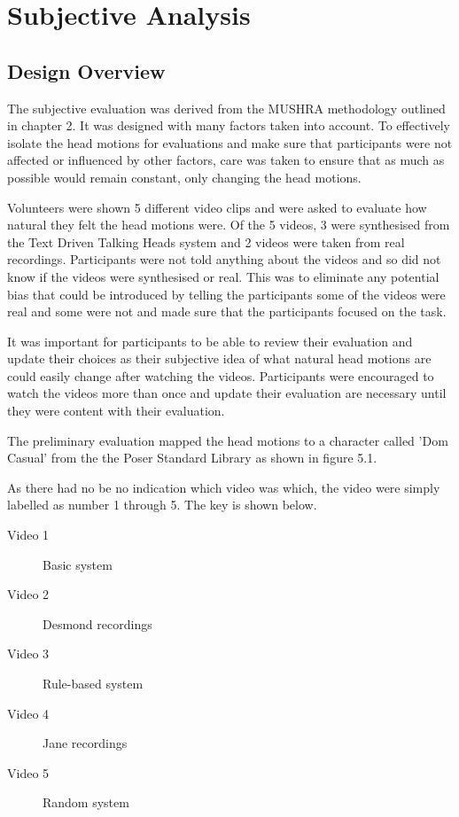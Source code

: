 \documentclass[bsc,frontabs,twoside,singlespacing,parskip,deptreport]{infthesis}
\begin{document}
\section{Subjective Analysis}

\subsection{Design Overview}

The subjective evaluation was derived from the MUSHRA methodology outlined in chapter 2. It was designed with many factors taken into account. To effectively isolate the head motions for evaluations and make sure that participants were not affected or influenced by other factors, care was taken to ensure that as much as possible would remain constant, only changing the head motions.

Volunteers were shown 5 different video clips and were asked to evaluate how natural they felt the head motions were. Of the 5 videos, 3 were synthesised from the Text Driven Talking Heads system and 2 videos were taken from real recordings. Participants were not told anything about the videos and so did not know if the videos were synthesised or real. This was to eliminate any potential bias that could be introduced by telling the participants some of the videos were real and some were not and made sure that the participants focused on the task.

It was important for participants to be able to review their evaluation and update their choices as their subjective idea of what natural head motions are could easily change after watching the videos. Participants were encouraged to watch the videos more than once and update their evaluation are necessary until they were content with their evaluation.

The preliminary evaluation mapped the head motions to a character called 'Dom Casual' from the the Poser Standard Library as shown in figure 5.1.

As there had no be no indication which video was which, the video were simply labelled as number 1 through 5. The key is shown below.

\begin{description}
  	\item[Video 1]	Basic system
  	\item[Video 2] Desmond recordings
	\item[Video 3] Rule-based system
	\item[Video 4] Jane recordings
	\item[Video 5] Random system
\end{description}
\end{document}
